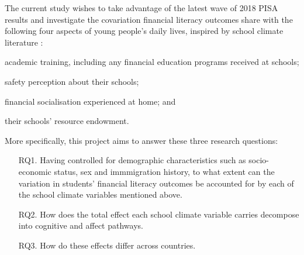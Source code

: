 \documentclass[a4paper,11pt,UKenglish,twoside,openright]{report}\usepackage[]{graphicx}\usepackage[]{color}
\begin{document}
The current study wishes to take advantage of the latest wave of 2018 PISA results and investigate the covariation financial literacy outcomes share with the following four aspects of young people's daily lives, inspired by school climate literature \parencite{wang:2016}:
\begin{enumerate*}[label={(\alph*)}]
    \item academic training, including any financial education programs received at schools;
    \item safety perception about their schools;
    \item financial socialisation experienced at home; and
    \item their schools' resource endowment.
\end{enumerate*}
More specifically, this project aims to answer these three research questions:
\begin{enumerate}
    \item[RQ1.] Having controlled for demographic characteristics such as socio-economic status, sex and immmigration history, to what extent can the variation in students' financial literacy outcomes be accounted for by each of the school climate variables mentioned above.
    \item[RQ2.] How does the total effect each school climate variable carries decompose into cognitive and affect pathways.
    \item[RQ3.] How do these effects differ across countries.
\end{enumerate}




\newpage
\end{document}
